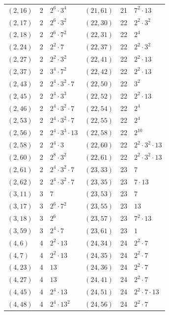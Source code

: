 \documentclass[11pt]{article}
\begin{document}
\begin{longtable}{@{}lrl@{\qquad}lrl@{}}
$(2,16)$ & 2 & $2^{6}\cdot 3^{4}$ & $(21,61)$ & 21 & $7^{2}\cdot 13$\\
$(2,17)$ & 2 & $2^{6}\cdot 3^{2}$ & $(22,30)$ & 22 & $2^{2}\cdot 3^{2}$\\
$(2,18)$ & 2 & $2^{6}\cdot 7^{2}$ & $(22,31)$ & 22 & $2^{4}$\\
$(2,24)$ & 2 & $2^{2}\cdot 7$ & $(22,37)$ & 22 & $2^{2}\cdot 3^{2}$\\
$(2,27)$ & 2 & $2^{2}\cdot 3^{2}$ & $(22,41)$ & 22 & $2^{2}\cdot 13$\\
$(2,37)$ & 2 & $3^{4}\cdot 7^{2}$ & $(22,42)$ & 22 & $2^{2}\cdot 13$\\
$(2,43)$ & 2 & $2^{4}\cdot 3^{2}\cdot 7$ & $(22,50)$ & 22 & $3^{2}$\\
$(2,45)$ & 2 & $2^{4}\cdot 3^{3}$ & $(22,52)$ & 22 & $2^{2}\cdot 13$\\
$(2,46)$ & 2 & $2^{4}\cdot 3^{2}\cdot 7$ & $(22,54)$ & 22 & $2^{4}$\\
$(2,53)$ & 2 & $2^{4}\cdot 3^{2}\cdot 7$ & $(22,55)$ & 22 & $2^{4}$\\
$(2,56)$ & 2 & $2^{4}\cdot 3^{3}\cdot 13$ & $(22,58)$ & 22 & $2^{10}$\\
$(2,58)$ & 2 & $2^{4}\cdot 3$ & $(22,60)$ & 22 & $2^{2}\cdot 3^{2}\cdot 13$\\
$(2,60)$ & 2 & $2^{8}\cdot 3^{2}$ & $(22,61)$ & 22 & $2^{2}\cdot 3^{2}\cdot 13$\\
$(2,61)$ & 2 & $2^{4}\cdot 3^{2}\cdot 7$ & $(23,33)$ & 23 & $7$\\
$(2,62)$ & 2 & $2^{4}\cdot 3^{2}\cdot 7$ & $(23,35)$ & 23 & $7\cdot 13$\\
$(3,11)$ & 3 & $7$ & $(23,53)$ & 23 & $7$\\
$(3,17)$ & 3 & $2^{6}\cdot 7^{2}$ & $(23,55)$ & 23 & $13$\\
$(3,18)$ & 3 & $2^{6}$ & $(23,57)$ & 23 & $7^{2}\cdot 13$\\
$(3,59)$ & 3 & $2^{4}\cdot 7$ & $(23,61)$ & 23 & $1$\\
$(4,6)$ & 4 & $2^{2}\cdot 13$ & $(24,34)$ & 24 & $2^{2}\cdot 7$\\
$(4,7)$ & 4 & $2^{2}\cdot 13$ & $(24,35)$ & 24 & $2^{2}\cdot 7$\\
$(4,23)$ & 4 & $13$ & $(24,36)$ & 24 & $2^{2}\cdot 7$\\
$(4,27)$ & 4 & $13$ & $(24,41)$ & 24 & $2^{2}\cdot 7$\\
$(4,45)$ & 4 & $2^{4}\cdot 13$ & $(24,51)$ & 24 & $2^{2}\cdot 7\cdot 13$\\
$(4,48)$ & 4 & $2^{4}\cdot 13^{2}$ & $(24,56)$ & 24 & $2^{2}\cdot 7$\\

\end{longtable}
\end{document}
